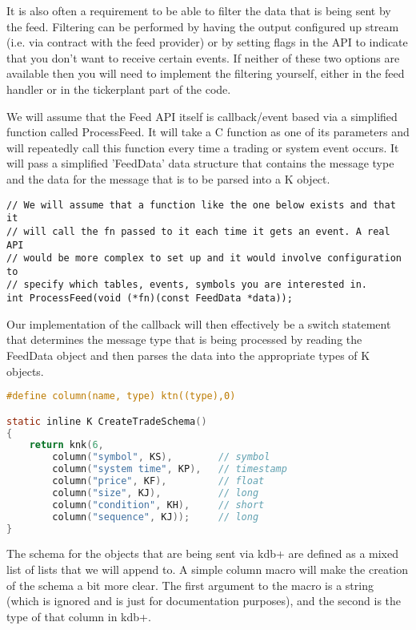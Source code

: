 It is also often a requirement to be able to filter the data that is being sent by the feed. Filtering can be
performed by having the output configured up stream (i.e. via contract with the feed provider) or by setting
flags in the API to indicate that you don't want to receive certain events. If neither of these two options
are available then you will need to implement the filtering yourself, either in the feed handler or in the
tickerplant part of the code.

We will assume that the Feed API itself is callback/event based via a simplified function called ProcessFeed.
It will take a C function as one of its parameters and will repeatedly call this function every time a trading
or system event occurs. It will pass a simplified 'FeedData' data structure that contains the message type and
the data for the message that is to be parsed into a K object.

\begin{lstlisting}
// We will assume that a function like the one below exists and that it
// will call the fn passed to it each time it gets an event. A real API
// would be more complex to set up and it would involve configuration to
// specify which tables, events, symbols you are interested in.
int ProcessFeed(void (*fn)(const FeedData *data));
\end{lstlisting}

Our implementation of the callback will then effectively be a switch statement that determines the message type
that is being processed by reading the FeedData object and then parses the data into the appropriate types of K
objects.

\begin{lstlisting}[language=C]
#define column(name, type) ktn((type),0)

static inline K CreateTradeSchema()
{
	return knk(6,
		column("symbol", KS),		 // symbol
		column("system time", KP),	 // timestamp
		column("price", KF),		 // float
		column("size", KJ),			 // long
		column("condition", KH),	 // short
		column("sequence", KJ));	 // long
}
\end{lstlisting}

The schema for the objects that are being sent via kdb+ are defined as a mixed list of lists that we will append
to. A simple column macro will make the creation of the schema a bit more clear. The first argument to the macro
is a string (which is ignored and is just for documentation purposes), and the second is the type of that column
in kdb+.

